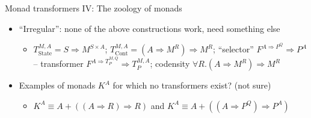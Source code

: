 \documentclass[english]{beamer}
\begin{document}
\begin{frame}{Monad transformers IV: The zoology of monads}
\begin{itemize}
\begin{itemize}
\item Free pointed monads $A+L^{A}$ -- transformer $M^{A+T_{L}^{M,A}}$
\end{itemize}
\item ``Irregular'': none of the above constructions work, need something
else
\begin{itemize}
\item {\footnotesize{}$T_{\text{State}}^{M,A}=S\Rightarrow M^{S\times A}$};
{\footnotesize{}$T_{\text{Cont}}^{M,A}=\left(A\Rightarrow M^{R}\right)\Rightarrow M^{R}$};
``selector'' {\footnotesize{}$F^{A\Rightarrow P^{Q}}\Rightarrow P^{A}$}
-- transformer $F^{A\Rightarrow T_{P}^{M,Q}}\Rightarrow T_{P}^{M,A}$;
codensity {\footnotesize{}$\forall R.\left(A\Rightarrow M^{R}\right)\Rightarrow M^{R}$}{\footnotesize\par}
\end{itemize}
\item Examples of monads $K^{A}$ for which no transformers exist? (not
sure)
\begin{itemize}
\item $K^{A}\equiv A+\left(\left(A\Rightarrow R\right)\Rightarrow R\right)$
and $K^{A}\equiv A+\left(\left(A\Rightarrow P^{Q}\right)\Rightarrow P^{A}\right)$
\end{itemize}
\end{itemize}
\end{frame}
\end{document}
